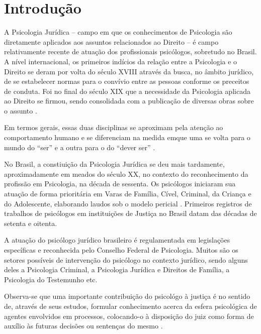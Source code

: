 
\chapter*[Introdução]{Introdução}

A Psicologia Jurídica -- campo em que os conhecimentos de Psicologia são diretamente aplicados aos assuntos relacionados ao Direito -- é campo relativamente recente de atuação dos profissionais psicólogos, sobretudo no Brasil. A nível internacional, os primeiros indícios da relação entre a Psicologia e o Direito se deram por volta do século XVIII através da busca, no âmbito jurídico, de se estabelecer normas para o convívio entre as pessoas conforme os preceitos de conduta. Foi no final do século XIX que a necessidade da Psicologia aplicada ao Direito se firmou, sendo consolidada com a publicação de diversas obras sobre o assunto \cite{JESUS2001}.

Em termos gerais, essas duas disciplinas se aproximam pela atenção ao comportamento humano e se diferenciam na medida emque uma se volta para o mundo do ``ser'' e a outra para o do ``dever ser'' .

No Brasil, a constiuição da Psicologia Jurídica se deu mais tardamente, aproximadamente em meados do século XX, no contexto do reconhecimento da profissão em Psicologia, na década de sessenta. Os psicólogos iniciaram sua atuação de forma prioritária em Varas de Família, Cível, Criminal, da Criança e do Adolescente, elaborando laudos sob o modelo pericial \cite{COSTA2009}. Primeiros  registros de trabalhos de psicólogos em instituições de Justiça no Brasil datam das décadas de setenta e oitenta.

A atuação do psicólogo jurídico brasileiro é regulamentada em legislações específicas e reconhecida pelo Conselho Federal de Psicologia. Muitos são os setores possíveis de intervenção do psicólogo no contexto jurídico, sendo alguns deles a Psicologia Criminal, a Psicologia Jurídica e Direitos de Família, a Psicologia do Testemunho etc. 

Observa-se que uma importante contribuição do psicológo à justiça é no sentido de, através de seus estudos, formular conhecimento acerca da esfera psicológica de agentes envolvidos em processos, colocando-o à disposição do juiz como forma de auxílio às futuras decisões ou sentenças do mesmo .

